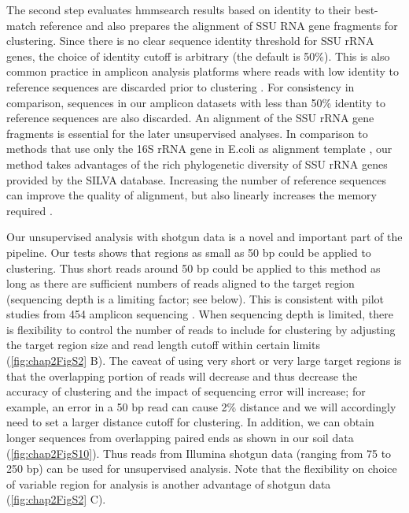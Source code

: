 \documentclass[]{msu-thesis}
\begin{document}
The second step evaluates hmmsearch results based on identity to their best-match reference and also prepares the alignment of SSU RNA gene fragments for clustering. Since there is no clear sequence identity threshold for SSU rRNA genes, the choice of identity cutoff is arbitrary (the default is 50\%). This is also common practice in amplicon analysis platforms where reads with low identity to reference sequences are discarded prior to clustering \cite{schloss_introducing_2009,kuczynski_using_2012}. For consistency in comparison, sequences in our amplicon datasets with less than 50\% identity to reference sequences are also discarded. An alignment of the SSU rRNA gene fragments is essential for the later unsupervised analyses. In comparison to methods that use only the 16S rRNA gene in E.coli as alignment template \cite{luo_soil_2014}, our method takes advantages of the rich phylogenetic diversity of SSU rRNA genes provided by the SILVA database. Increasing the number of reference sequences can improve the quality of alignment, but also linearly increases the memory required \cite{schloss_high-throughput_2009,caporaso_pynast:_2010}.

Our unsupervised analysis with shotgun data is a novel and important part of the pipeline. Our tests shows that regions as small as 50 bp could be applied to clustering. Thus short reads around 50 bp could be applied to this method as long as there are sufficient numbers of reads aligned to the target region (sequencing depth is a limiting factor; see below). This is consistent with pilot studies from 454 amplicon sequencing \cite{liu_short_2007,sogin_microbial_2006}. When sequencing depth is limited, there is flexibility to control the number of reads to include for clustering by adjusting the target region size and read length cutoff within certain limits (\cref{fig:chap2FigS2} B). The caveat of using very short or very large target regions is that the overlapping portion of reads will decrease and thus decrease the accuracy of clustering and the impact of sequencing error will increase; for example, an error in a 50 bp read can cause 2\% distance and we will accordingly need to set a larger distance cutoff for clustering. In addition, we can obtain longer sequences from overlapping paired ends as shown in our soil data (\cref{fig:chap2FigS10}). Thus reads from Illumina shotgun data (ranging from 75 to 250 bp) can be used for unsupervised analysis. Note that the flexibility on choice of variable region for analysis is another advantage of shotgun data (\cref{fig:chap2FigS2} C).
\end{document}
